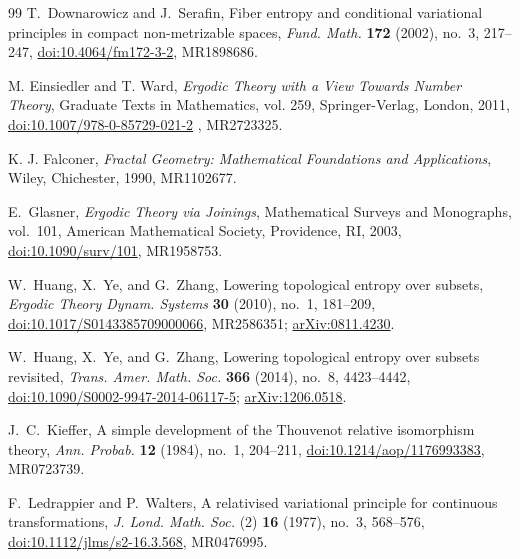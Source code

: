 \documentclass[12pt,letterpaper,reqno]{amsart}
\theoremstyle{definition}
\theoremstyle{remark}
\numberwithin{equation}{section}
\begin{document}
\begin{sloppypar}
\begin{thebibliography}{99}
			T.~Downarowicz and J.~Serafin,
			Fiber entropy and conditional variational principles in compact
			non-metrizable spaces,
			\emph{Fund. Math.} \textbf{172} (2002), no.~3, 217--247,
			\href{https://doi.org/10.4064/fm172-3-2}
			{doi:10.4064/fm172-3-2},
			MR1898686.
			
			M. Einsiedler and T. Ward, \emph{Ergodic Theory with a View Towards Number Theory}, Graduate Texts in Mathematics, vol. 259, Springer-Verlag, London, 2011, \href{http://doi:10.1007/978-0-85729-021-2}{doi:10.1007/978-0-85729-021-2} , MR2723325.
			
			K. J. Falconer, \emph{Fractal Geometry: Mathematical Foundations and Applications}, Wiley, Chichester, 1990, MR1102677.
			
			E.~Glasner,
			\emph{Ergodic Theory via Joinings},
			Mathematical Surveys and Monographs, vol.~101,
			American Mathematical Society, Providence, RI, 2003,
			\href{https://doi.org/10.1090/surv/101}
			{doi:10.1090/surv/101},
			MR1958753.
			
			W.~Huang, X.~Ye, and G.~Zhang,
			Lowering topological entropy over subsets,
			\emph{Ergodic Theory Dynam. Systems} \textbf{30} (2010), no.~1, 181--209,
			\href{https://doi.org/10.1017/S0143385709000066}
			{doi:10.1017/S0143385709000066},
			MR2586351;
			\href{https://arxiv.org/abs/0811.4230}{arXiv:0811.4230}.
			
			W.~Huang, X.~Ye, and G.~Zhang,
			Lowering topological entropy over subsets revisited,
			\emph{Trans. Amer. Math. Soc.} \textbf{366} (2014), no.~8, 4423--4442,
			\href{https://doi.org/10.1090/S0002-9947-2014-06117-5}
			{doi:10.1090/S0002-9947-2014-06117-5};
			\href{https://arxiv.org/abs/1206.0518}{arXiv:1206.0518}.
			
			J.~C.~Kieffer,
			A simple development of the Thouvenot relative isomorphism theory,
			\emph{Ann. Probab.} \textbf{12} (1984), no.~1, 204--211,
			\href{https://doi.org/10.1214/aop/1176993383}
			{doi:10.1214/aop/1176993383},
			MR0723739.
			
			F.~Ledrappier and P.~Walters,
			A relativised variational principle for continuous transformations,
			\emph{J. Lond. Math. Soc.} (2) \textbf{16} (1977), no.~3, 568--576,
			\href{https://doi.org/10.1112/jlms/s2-16.3.568}
			{doi:10.1112/jlms/s2-16.3.568},
			MR0476995.
			

\end{thebibliography}
\end{sloppypar}
\end{document}
